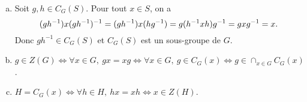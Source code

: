 \begin{enumerate}[a)]
  \item Soit $g,h\in C_G(S)$. Pour tout $x\in S$, on a
    \[
      (gh^{-1})x(gh^{-1})^{-1} = (gh^{-1})x(hg^{-1})
      = g(h^{-1}xh)g^{-1}
      = gxg^{-1} \\
      = x.
    \]
    Donc $gh^{-1}\in C_G(S)$ et $C_G(S)$ est un sous-groupe de $G$.

  \item $g\in Z(G) \Leftrightarrow \forall x\in G,\: gx=xg
    \Leftrightarrow \forall x\in G,\: g\in C_G(x)
    \Leftrightarrow g\in\cap_{x\in G} C_G(x)$.
  
  \item $H = C_G(x) \Leftrightarrow \forall h\in H,\: hx=xh 
    \Leftrightarrow x\in Z(H)$.
\end{enumerate}

